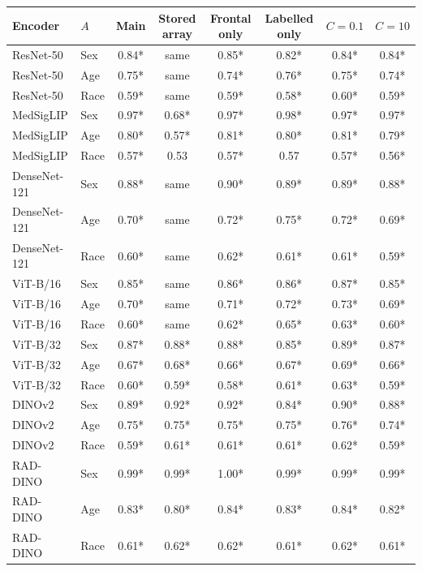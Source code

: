 \begin{tabular}{llcccccc}
\toprule
Encoder & $A$ & Main & Stored array & Frontal only & Labelled only & $C=0.1$ & $C=10$ \\
\midrule
ResNet-50 & Sex & 0.84* & same & 0.85* & 0.82* & 0.84* & 0.84* \\
ResNet-50 & Age & 0.75* & same & 0.74* & 0.76* & 0.75* & 0.74* \\
ResNet-50 & Race & 0.59* & same & 0.59* & 0.58* & 0.60* & 0.59* \\
MedSigLIP & Sex & 0.97* & 0.68* & 0.97* & 0.98* & 0.97* & 0.97* \\
MedSigLIP & Age & 0.80* & 0.57* & 0.81* & 0.80* & 0.81* & 0.79* \\
MedSigLIP & Race & 0.57* & 0.53 & 0.57* & 0.57 & 0.57* & 0.56* \\
DenseNet-121 & Sex & 0.88* & same & 0.90* & 0.89* & 0.89* & 0.88* \\
DenseNet-121 & Age & 0.70* & same & 0.72* & 0.75* & 0.72* & 0.69* \\
DenseNet-121 & Race & 0.60* & same & 0.62* & 0.61* & 0.61* & 0.59* \\
ViT-B/16 & Sex & 0.85* & same & 0.86* & 0.86* & 0.87* & 0.85* \\
ViT-B/16 & Age & 0.70* & same & 0.71* & 0.72* & 0.73* & 0.69* \\
ViT-B/16 & Race & 0.60* & same & 0.62* & 0.65* & 0.63* & 0.60* \\
ViT-B/32 & Sex & 0.87* & 0.88* & 0.88* & 0.85* & 0.89* & 0.87* \\
ViT-B/32 & Age & 0.67* & 0.68* & 0.66* & 0.67* & 0.69* & 0.66* \\
ViT-B/32 & Race & 0.60* & 0.59* & 0.58* & 0.61* & 0.63* & 0.59* \\
DINOv2 & Sex & 0.89* & 0.92* & 0.92* & 0.84* & 0.90* & 0.88* \\
DINOv2 & Age & 0.75* & 0.75* & 0.75* & 0.75* & 0.76* & 0.74* \\
DINOv2 & Race & 0.59* & 0.61* & 0.61* & 0.61* & 0.62* & 0.59* \\
RAD-DINO & Sex & 0.99* & 0.99* & 1.00* & 0.99* & 0.99* & 0.99* \\
RAD-DINO & Age & 0.83* & 0.80* & 0.84* & 0.83* & 0.84* & 0.82* \\
RAD-DINO & Race & 0.61* & 0.62* & 0.62* & 0.61* & 0.62* & 0.61* \\
\bottomrule
\end{tabular}
